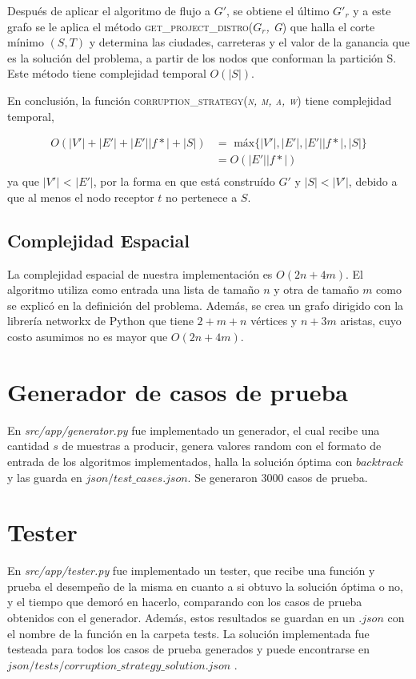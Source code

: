 \documentclass[10pt]{article} %
\begin{document}
	Despu\'es de aplicar el algoritmo de flujo a $G'$, se obtiene el \'ultimo $G'_r$ y a este grafo se le aplica el m\'etodo \textsc{get\_project\_distro(\textit{$G_r$, G})} que halla el corte m\'inimo $(S,T)$ y determina las ciudades, carreteras y el valor de la ganancia que es la soluci\'on del problema, a partir de los nodos que conforman la partici\'on S. Este m\'etodo tiene complejidad temporal $O(|S|)$.
	
	En conclusi\'on, la funci\'on \textsc{corruption\_strategy(\textit{n, m, a, w})} tiene complejidad temporal,
	
	\begin{equation}
		\begin{aligned}
			O(|V'| + |E'| + |E'||f*| + |S|) &=\text{ m\'ax}\{|V'|, |E'|, |E'||f*|, |S|\}\\
			&=O(|E'||f*|)\\
		\end{aligned}		
	\end{equation}
	ya que $|V'|$ < $|E'|$, por la forma en que est\'a constru\'ido $G'$ y $|S|<|V'|$, debido a que al menos el nodo receptor $t$ no pertenece a $S$.

	

	\subsection{Complejidad Espacial}
	
	La complejidad espacial de nuestra implementaci\'on es $O(2n + 4m)$. El algoritmo utiliza como entrada una lista de tama\~no $n$ y otra de tama\~no $m$ como se explic\'o en la definici\'on del problema. Adem\'as, se crea un grafo dirigido con la librer\'ia networkx de Python que tiene $2 + m + n$ v\'ertices y $n + 3m$ aristas, cuyo costo asumimos no es mayor que $O(2n + 4m)$.
		
	\section{Generador de casos de prueba}
	
	En \textit{src/app/generator.py} fue implementado un generador, el cual recibe una cantidad $ s $ de muestras a producir, genera valores random con el formato de entrada de los algoritmos implementados, halla la soluci\'on \'optima con $ backtrack $ y las guarda en $ json/test\_cases.json $. Se generaron 3000 casos de prueba.
	
	\section{Tester}
	En \textit{src/app/tester.py} fue implementado un tester, que recibe una funci\'on y prueba el desempe\~no de la misma en cuanto a si obtuvo la soluci\'on \'optima o no, y el tiempo que demor\'o en hacerlo, comparando con los casos de prueba obtenidos con el generador. Adem\'as, estos resultados se guardan en un $ .json $ con el nombre de la funci\'on en la carpeta tests. La soluci\'on implementada fue testeada para todos los casos de prueba generados y puede encontrarse en $ json/tests/corruption\_strategy\_solution.json $ .
	
\end{document}
